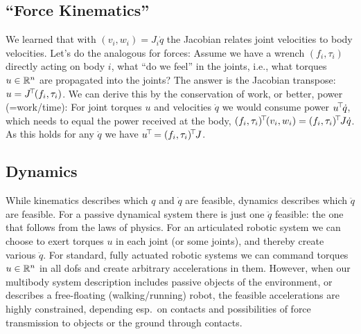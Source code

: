 \subsection{``Force Kinematics''}

We learned that with 
$(v_i,w_i) = J_i \dot q$ the Jacobian relates joint velocities to body
velocities. Let's do the analogous for forces: Assume we have a wrench
$(f_i,\tau_i)$ directly acting on body $i$, what ``do we feel'' in the
joints, i.e., what torques $u\in{\mathbb{R}}^n$ are propagated into the
joints? The answer is the Jacobian transpose: $u = J^{\!\top\!}
(f_i,\tau_i)$. We can derive this by the conservation of work, or better,
power (=work/time): For joint torques $u$ and velocities $\dot q$ we
would consume power $u^{\!\top\!} \dot q$, which needs to equal the power
received at the body, $(f_i,\tau_i)^{\!\top\!} (v_i,w_i) = (f_i,\tau_i)^{\!\top\!} J
\dot q$. As this holds for any $\dot q$ we have $u^{\!\top\!} = (f_i,\tau_i)^{\!\top\!} J$.


\subsection{Dynamics}

While kinematics describes which $q$ and $\dot
q$ are feasible, dynamics describes which $\ddot q$ are feasible. For
a passive dynamical system there is just one $\ddot q$ feasible: the
one that follows from the laws of physics. For an articulated robotic
system we can choose to exert torques $u$ in each joint (or some joints), and
thereby create various $\ddot q$. For standard, fully actuated robotic systems
we can command torques $u\in{\mathbb{R}}^n$ in all dofs and create arbitrary
accelerations in them. However, when our multibody system description includes
passive objects of the environment, or describes a free-floating
(walking/running) robot, the feasible accelerations are highly constrained,
depending esp.\ on contacts and possibilities of force transmission
to objects or the ground through contacts.


